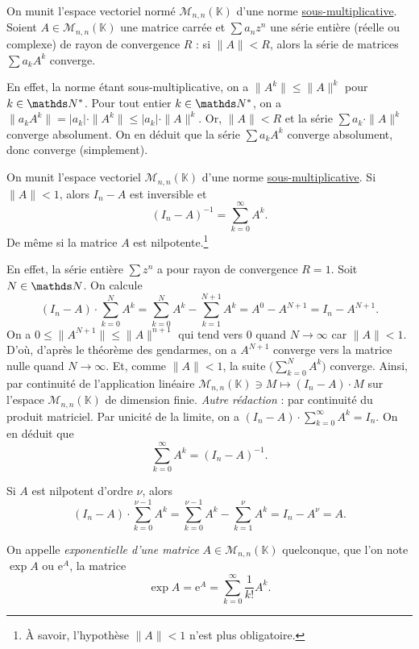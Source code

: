 \begin{rmkn}
	On munit l'espace vectoriel normé $\mathcal{M}_{n,n}(\mathds{K})$ d'une norme \ul{sous-multiplicative}. Soient $A \in \mathcal{M}_{n,n}(\mathds{K})$ une matrice carrée et $\sum a_n z^n$ une série entière (réelle ou complexe) de rayon de convergence $R$ : si $\|A\| < R$, alors la série de matrices $\sum a_k A^k$ converge.

	En effet, la norme étant sous-multiplicative, on a $\|A^k\| \le \|A\|^k$ pour $k \in \N^*$.
	Pour tout entier $k \in \N^*$, on a $\|a_k A^k\| = |a_k| \cdot \|A^k\| \le |a_k| \cdot \|A\|^k$.
	Or, $\|A\| < R$ et la série $\sum a_k \cdot \|A\|^k$ converge absolument.
	On en déduit que la série $\sum a_k A^k$\/ converge absolument, donc converge (simplement).
\end{rmkn}

\bigskip

\begin{exm}
	On munit l'espace vectoriel $\mathcal{M}_{n,n}(\mathds{K})$ d'une norme \ul{sous-multiplicative}.
	Si $\|A\| < 1$, alors $I_n - A$ est inversible et \[
		(I_n - A)^{-1} = \sum_{k=0}^\infty A^k
	.\]
	De même si la matrice $A$ est nilpotente.\footnote{À savoir, l'hypothèse $\|A\| < 1$\/ n'est plus obligatoire.}

	En effet, la série entière $\sum z^n$\/ a pour rayon de convergence $R = 1$.
	Soit $N \in \N$.
	On calcule
	\[
		(I_n - A) \cdot \sum_{k=0}^N A^k = \sum_{k=0}^N A^k - \sum_{k=1}^{N+1} A^k = A^0 - A^{N+1} = I_n - A^{N+1}
	.\]
	On a $0\le \|A^{N+1}\| \le \|A\|^{n+1}$ qui tend vers $0$ quand $N\to \infty$ car $\|A\| < 1$.
	D'où, d'après le théorème des gendarmes, on a $A^{N+1}$ converge vers la matrice nulle quand $N \to \infty$.
	Et, comme $\|A\| < 1$, la suite $\big(\sum_{k=0}^N A^k\big)$ converge.
	Ainsi, par continuité de l'application linéaire $\mathcal{M}_{n,n}(\mathds{K}) \ni M \mapsto (I_n - A) \cdot M$ sur l'espace $\mathcal{M}_{n,n}(\mathds{K})$ de dimension finie.
	\textsl{Autre rédaction} : par continuité du produit matriciel.
	Par unicité de la limite, on a $(I_n - A) \cdot \sum_{k=0}^\infty A^k = I_n$.
	On en déduit que \[
		\sum_{k=0}^\infty A^k = (I_n - A)^{-1}
	.\]

	Si $A$ est nilpotent d'ordre $\nu$, alors
	\[
		(I_n - A) \cdot \sum_{k=0}^{\nu - 1} A^k = \sum_{k=0}^{\nu - 1} A^k - \sum_{k=1}^\nu A^k = I_n - A^{\nu} = A
	.\]
\end{exm}

\begin{defn}
	On appelle \textit{exponentielle d'une matrice} $A \in \mathcal{M}_{n,n}(\mathds{K})$ quelconque, que l'on note $\exp A$ ou $\mathrm{e}^A$, la matrice \[
		\exp A = \mathrm{e}^A = \sum_{k=0}^\infty \frac{1}{k!}A^k
	.\] 
\end{defn}

